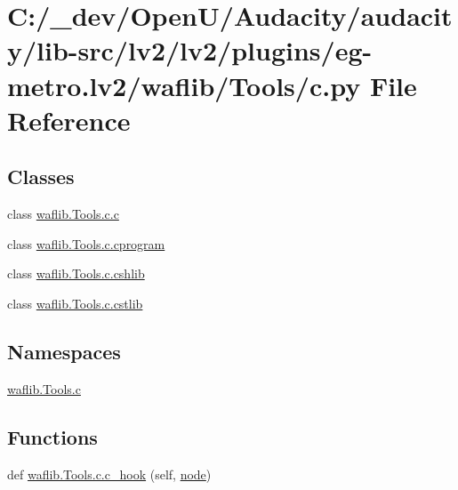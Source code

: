\hypertarget{lv2_2plugins_2eg-metro_8lv2_2waflib_2_tools_2c_8py}{}\section{C\+:/\+\_\+dev/\+Open\+U/\+Audacity/audacity/lib-\/src/lv2/lv2/plugins/eg-\/metro.lv2/waflib/\+Tools/c.py File Reference}
\label{lv2_2plugins_2eg-metro_8lv2_2waflib_2_tools_2c_8py}
\subsection*{Classes}
\begin{DoxyCompactItemize}
\item 
class \hyperlink{classwaflib_1_1_tools_1_1c_1_1c}{waflib.\+Tools.\+c.\+c}
\item 
class \hyperlink{classwaflib_1_1_tools_1_1c_1_1cprogram}{waflib.\+Tools.\+c.\+cprogram}
\item 
class \hyperlink{classwaflib_1_1_tools_1_1c_1_1cshlib}{waflib.\+Tools.\+c.\+cshlib}
\item 
class \hyperlink{classwaflib_1_1_tools_1_1c_1_1cstlib}{waflib.\+Tools.\+c.\+cstlib}
\end{DoxyCompactItemize}
\subsection*{Namespaces}
\begin{DoxyCompactItemize}
\item 
 \hyperlink{namespacewaflib_1_1_tools_1_1c}{waflib.\+Tools.\+c}
\end{DoxyCompactItemize}
\subsection*{Functions}
\begin{DoxyCompactItemize}
\item 
def \hyperlink{namespacewaflib_1_1_tools_1_1c_a133cda6439588809c5d3ccdc6bf3c5d1}{waflib.\+Tools.\+c.\+c\+\_\+hook} (self, \hyperlink{structnode}{node})
\end{DoxyCompactItemize}
